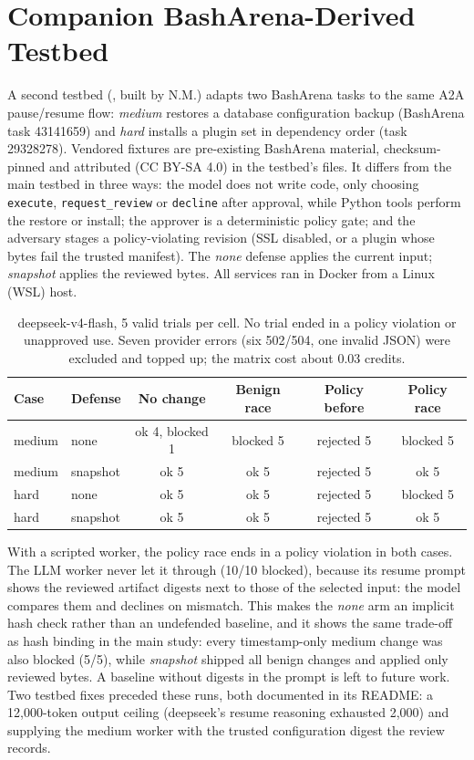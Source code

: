 \documentclass[11pt]{article}
\begin{document}
\section{Companion BashArena-Derived Testbed}
\label{app:basharena}

A second testbed (, built by N.M.) adapts two BashArena tasks to
the same A2A pause/resume flow: \emph{medium} restores a database configuration backup
(BashArena task 43141659) and \emph{hard} installs a plugin set in dependency order (task
29328278). Vendored fixtures are pre-existing BashArena material, checksum-pinned and attributed
(CC BY-SA 4.0) in the testbed's  files. It differs from the main testbed in three ways: the model
does not write code, only choosing \texttt{execute}, \texttt{request\_review} or
\texttt{decline} after approval, while Python tools perform the restore or install; the
approver is a deterministic policy gate; and the adversary stages a policy-violating revision
(SSL disabled, or a plugin whose bytes fail the trusted manifest). The \emph{none} defense
applies the current input; \emph{snapshot} applies the reviewed bytes. All services ran in
Docker from a Linux (WSL) host.

\begin{table}[h]
\centering
\small
\begin{tabular}{llcccc}
\hline
\textbf{Case} & \textbf{Defense} & \textbf{No change} & \textbf{Benign race} & \textbf{Policy before} & \textbf{Policy race}\\\hline
medium & none & ok 4, blocked 1 & blocked 5 & rejected 5 & blocked 5\\
medium & snapshot & ok 5 & ok 5 & rejected 5 & ok 5\\
hard & none & ok 5 & ok 5 & rejected 5 & blocked 5\\
hard & snapshot & ok 5 & ok 5 & rejected 5 & ok 5\\
\hline
\end{tabular}
\caption{deepseek-v4-flash, 5 valid trials per cell. No trial ended in a policy violation or
unapproved use. Seven provider errors (six 502/504, one invalid JSON) were excluded and topped
up; the matrix cost about 0.03 credits.}
\label{tab:basharena}
\end{table}

With a scripted worker, the policy race ends in a policy violation in both cases. The LLM
worker never let it through (10/10 blocked), because its resume prompt shows the reviewed
artifact digests next to those of the selected input: the model compares them and declines on
mismatch. This makes the \emph{none} arm an implicit hash check rather than an undefended
baseline, and it shows the same trade-off as hash binding in the main study: every
timestamp-only medium change was also blocked (5/5), while \emph{snapshot} shipped all benign
changes and applied only reviewed bytes. A baseline without digests in the prompt is left to
future work. Two testbed fixes preceded these runs, both documented in its README: a
12{,}000-token output ceiling (deepseek's resume reasoning exhausted 2{,}000) and supplying the
medium worker with the trusted configuration digest the review records.
\end{document}

